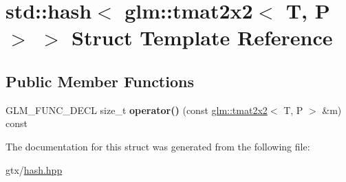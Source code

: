 \hypertarget{structstd_1_1hash_3_01glm_1_1tmat2x2_3_01T_00_01P_01_4_01_4}{\section{std\-:\-:hash$<$ glm\-:\-:tmat2x2$<$ T, P $>$ $>$ Struct Template Reference}
\label{structstd_1_1hash_3_01glm_1_1tmat2x2_3_01T_00_01P_01_4_01_4}
}
\subsection*{Public Member Functions}
\begin{DoxyCompactItemize}
\item 
\hypertarget{structstd_1_1hash_3_01glm_1_1tmat2x2_3_01T_00_01P_01_4_01_4_a33df9a0376f3e34d90d2b893eaa58f9d}{G\-L\-M\-\_\-\-F\-U\-N\-C\-\_\-\-D\-E\-C\-L size\-\_\-t {\bfseries operator()} (const \hyperlink{structglm_1_1tmat2x2}{glm\-::tmat2x2}$<$ T, P $>$ \&m) const }\label{structstd_1_1hash_3_01glm_1_1tmat2x2_3_01T_00_01P_01_4_01_4_a33df9a0376f3e34d90d2b893eaa58f9d}

\end{DoxyCompactItemize}


The documentation for this struct was generated from the following file\-:\begin{DoxyCompactItemize}
\item 
gtx/\hyperlink{hash_8hpp}{hash.\-hpp}\end{DoxyCompactItemize}
